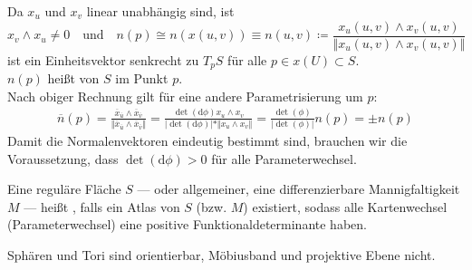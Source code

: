 \begin{definition}[Normalenvektor]
  Da \( x_u \) und \( x_v \) linear unabhängig sind, ist
  \begin{equation*}
    x_v \wedge x_u \neq 0 \quad \text{und} \quad n(p) \cong n(x(u,v)) \equiv n(u,v) \coloneqq \frac{x_u(u,v) \wedge x_v(u,v)}{\Vert x_u(u,v) \wedge x_v(u,v) \Vert}
  \end{equation*}
  ist ein Einheitsvektor senkrecht zu \( T_p S \) für alle \( p \in x(U) \subset S \). \\
  \( n(p) \) heißt \label{def:normalenvektor} von \( S \) im Punkt \( p \). \\
  Nach obiger Rechnung gilt für eine andere Parametrisierung um \( p \):
  \begin{align*}
    \overline{n}(p) = \frac{\overline{x}_{\overline{u}} \wedge \overline{x}_{\overline{v}}}{\Vert \overline{x}_{\overline{u}} \wedge \overline{x}_{\overline{v}} \Vert} = \frac{\det(\text{d}\phi)x_u \wedge x_v}{\vert \det(\text{d}\phi) \vert * \Vert x_u \wedge x_v \Vert} = \frac{\det(\phi)}{\vert \det(\phi) \vert} n(p) = \pm n(p)
  \end{align*}
  Damit die Normalenvektoren eindeutig bestimmt sind, brauchen wir die Voraussetzung, dass \( \det(\text{d}\phi) > 0 \) für alle Parameterwechsel.
\end{definition}

\begin{definition}[Orientierbarkeit]
  Eine reguläre Fläche \( S \) --- oder allgemeiner, eine differenzierbare Mannigfaltigkeit \( M \) --- heißt \label{def:orientierbarkeit}, falls ein Atlas von \( S \) (bzw. \( M \)) existiert, sodass alle Kartenwechsel (Parameterwechsel) eine positive Funktionaldeterminante haben.
\end{definition}

\begin{example}
  Sphären und Tori sind orientierbar, Möbiusband und projektive Ebene nicht.
\end{example}

